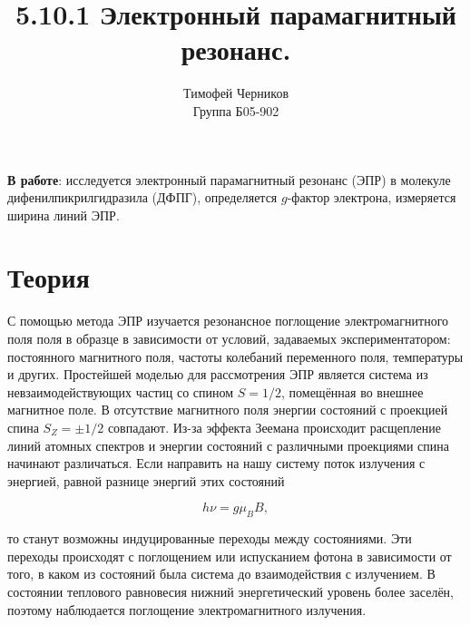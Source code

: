 \documentclass[a4paper,12pt]{article}
\author{Тимофей Черников\\
Группа Б05-902}
\title{5.10.1 Электронный парамагнитный резонанс.}
\date{}
\begin{document}
\maketitle
\textbf{В работе}: исследуется электронный парамагнитный резонанс (ЭПР) в молекуле дифенилпикрилгидразила (ДФПГ), 
определяется $g$-фактор электрона, измеряется ширина линий ЭПР.


\section*{Теория}
    С помощью метода ЭПР изучается резонансное поглощение электромагнитного поля поля в образце в зависимости от условий,
    задаваемых экспериментатором: постоянного магнитного поля, частоты колебаний переменного поля, температуры и других.
    Простейшей моделью для рассмотрения ЭПР является система из невзаимодействующих
    частиц со спином $S = 1/2$, помещённая во внешнее магнитное поле. В отсутствие
    магнитного поля энергии состояний с проекцией спина $S_Z = \pm 1/2$ совпадают. 
    Из-за эффекта Зеемана происходит расщепление линий атомных спектров и энергии состояний с различными проекциями спина начинают различаться. 
    Если направить на нашу систему поток излучения с энергией, равной разнице энергий этих состояний 

    \begin{equation}\label{2}
    h \nu = g\mu_B B,
    \end{equation} 

    то станут возможны индуцированные переходы между состояниями. 
    Эти переходы происходят с поглощением или испусканием фотона в зависимости от того, 
    в каком из состояний была система до взаимодействия с излучением. 
    В состоянии теплового равновесия нижний энергетический уровень более заселён, 
    поэтому наблюдается поглощение электромагнитного излучения. \\
\end{document}
